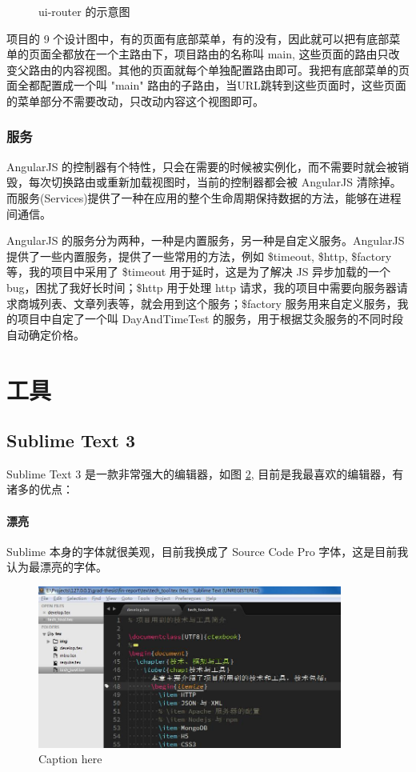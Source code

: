 \documentclass[UTF8]{ctexbook}
\begin{document}
{{\begin{figure}[H]
                  \caption{ui-router 的示意图}
                  \label{fig:ui_view}
                \end{figure}
                项目的 9 个设计图中，有的页面有底部菜单，有的没有，因此就可以把有底部菜单的页面全都放在一个主路由下，项目路由的名称叫 main, 这些页面的路由只改变父路由的内容视图。其他的页面就每个单独配置路由即可。我把有底部菜单的页面全都配置成一个叫 "main" 路由的子路由，当URL跳转到这些页面时，这些页面的菜单部分不需要改动，只改动内容这个视图即可。

            \subsubsection{服务}
              \label{subsubsec:服务}
                AngularJS 的控制器有个特性，只会在需要的时候被实例化，而不需要时就会被销毁，每次切换路由或重新加载视图时，当前的控制器都会被 AngularJS 清除掉。而服务(Services)提供了一种在应用的整个生命周期保持数据的方法，能够在进程间通信。
                \par
                AngularJS 的服务分为两种，一种是内置服务，另一种是自定义服务。AngularJS 提供了一些内置服务，提供了一些常用的方法，例如
                \$timeout, \$http, \$factory等，我的项目中采用了 \$timeout 用于延时，这是为了解决 JS 异步加载的一个 bug，困扰了我好长时间；\$http 用于处理 http 请求，我的项目中需要向服务器请求商城列表、文章列表等，就会用到这个服务；\$factory 服务用来自定义服务，我的项目中自定了一个叫 DayAndTimeTest 的服务，用于根据艾灸服务的不同时段自动确定价格。

    \section{工具}
      \label{sec:工具}
        \subsection{Sublime Text 3}
          \label{subsec:sublime_text_3}
            Sublime Text 3 是一款非常强大的编辑器，如图 \ref{fig:sublime}, 目前是我最喜欢的编辑器，有诸多的优点：
            \paragraph{漂亮} Sublime 本身的字体就很美观，目前我换成了 Source Code Pro 字体，这是目前我认为最漂亮的字体。
            \begin{figure}[H]
              \centering
              \includegraphics[width=10cm]{./img/sublime.jpg}
              \caption{Caption here}
              \label{fig:sublime}
            \end{figure}

}}
\end{document}

